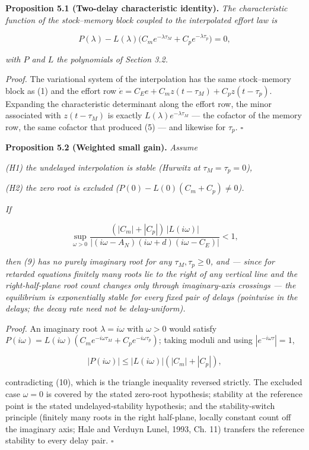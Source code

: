 \documentclass[11pt]{article}
\begin{document}
\textbf{Proposition 5.1 (Two-delay characteristic identity).} \emph{The
characteristic function of the stock--memory block coupled to the
interpolated effort law is}

\[P(\lambda) - L(\lambda)\bigl( C_m e^{-\lambda\tau_M} + C_p e^{-\lambda\tau_p} \bigr) = 0, \tag{9}\]

\emph{with \(P\) and \(L\) the polynomials of Section 3.2.}

\emph{Proof.} The variational system of the interpolation has the same
stock--memory block as (1) and the effort row
\(\dot e = C_E e + C_m z(t-\tau_M) + C_p z(t-\tau_p)\). Expanding the
characteristic determinant along the effort row, the minor associated
with \(z(t-\tau_M)\) is exactly \(L(\lambda)e^{-\lambda\tau_M}\) --- the
cofactor of the memory row, the same cofactor that produced (5) --- and
likewise for \(\tau_p\). \ensuremath{\square}

\textbf{Proposition 5.2 (Weighted small gain).} \emph{Assume}

\emph{(H1) the undelayed interpolation is stable (Hurwitz at
\(\tau_M = \tau_p = 0\)),}

\emph{(H2) the zero root is excluded
(\(P(0) - L(0)(C_m + C_p) \neq 0\)).}

\emph{If}

\[\sup_{\omega > 0} \frac{(|C_m| + |C_p|)\, |L(i\omega)|}{|(i\omega - A_N)(i\omega + d)(i\omega - C_E)|} < 1, \tag{10}\]

\emph{then (9) has no purely imaginary root for any
\(\tau_M, \tau_p \ge 0\), and --- since for retarded equations finitely
many roots lie to the right of any vertical line and the
right-half-plane root count changes only through imaginary-axis
crossings --- the equilibrium is exponentially stable for every fixed
pair of delays (pointwise in the delays; the decay rate need not be
delay-uniform).}

\emph{Proof.} An imaginary root \(\lambda = i\omega\) with
\(\omega > 0\) would satisfy
\(P(i\omega) = L(i\omega)(C_m e^{-i\omega\tau_M} + C_p e^{-i\omega\tau_p})\);
taking moduli and using \(|e^{-i\omega\tau}| = 1\),

\[|P(i\omega)| \le |L(i\omega)|(|C_m| + |C_p|),\]

contradicting (10), which is the triangle inequality reversed strictly.
The excluded case \(\omega = 0\) is covered by the stated zero-root
hypothesis; stability at the reference point is the stated
undelayed-stability hypothesis; and the stability-switch principle
(finitely many roots in the right half-plane, locally constant count off
the imaginary axis; Hale and Verduyn Lunel, 1993, Ch. 11) transfers the
reference stability to every delay pair. \ensuremath{\square}
\end{document}
